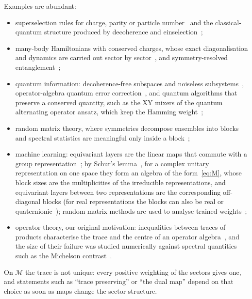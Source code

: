 \documentclass[11pt]{article}
\newcommand{\M}{\mathcal{M}}
\begin{document}
Examples are abundant:
\begin{itemize}\itemsep0pt
\item superselection rules for charge, parity or particle number~\cite{wick1952,bartlett2007} and the
classical-quantum structure produced by decoherence and einselection~\cite{zurek2003};
\item many-body Hamiltonians with conserved charges, whose exact diagonalisation and dynamics are carried out
sector by sector~\cite{sandvik2010,weinberg2017}, and symmetry-resolved entanglement~\cite{goldstein2018,xavier2018};
\item quantum information: decoherence-free subspaces and noiseless subsystems~\cite{zanardi1997,knill2000},
operator-algebra quantum error correction~\cite{beny2007}, and quantum algorithms that preserve a conserved
quantity, such as the XY mixers of the quantum alternating operator ansatz, which keep the Hamming
weight~\cite{hadfield2019};
\item random matrix theory, where symmetries decompose ensembles into blocks and spectral statistics are
meaningful only inside a block~\cite{dyson1962,mehta2004};
\item machine learning: equivariant layers are the linear maps that commute with a group
representation~\cite{cohen2016,finzi2021}; by Schur's lemma~\cite{fulton1991}, for a complex unitary representation
on one space they form an algebra of the form~\eqref{eq:M}, whose block sizes are the multiplicities of the
irreducible representations, and equivariant layers between two representations are the corresponding off-diagonal
blocks (for real representations the blocks can also be real or quaternionic~\cite[\S3.5]{fulton1991}); random-matrix methods are used to analyse trained
weights~\cite{martin2021};
\item operator theory, our original motivation: inequalities between traces of products characterise the trace
and the centre of an operator algebra~\cite{gardner1979,petz1988,novikov2015,virosztek2017}, and the size of
their failure was studied numerically against spectral quantities such as the Michelson contrast~\cite{abed2024}.
\end{itemize}
On $\M$ the trace is not unique: every positive weighting of the sectors gives one, and statements such as
``trace preserving'' or ``the dual map'' depend on that choice as soon as maps change the sector structure.
\end{document}
